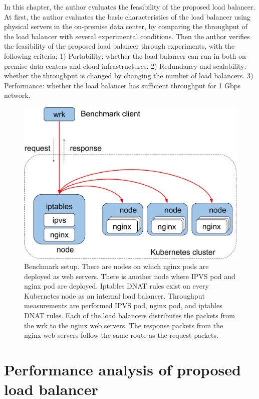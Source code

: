 In this chapter, the author evaluates the feasibility of the proposed load balancer.
At first, the author evaluates the basic characteristics of the load balancer using physical servers in the on-premise data center, by comparing the throughput of the load balancer with several experimental conditions.
Then the author verifies the feasibility of the proposed load balancer through experiments, with the following criteria;
1) Portability: whether the load balancer can run in both on-premise data centers and cloud infrastructures.
2) Redundancy and scalability: whether the throughput is changed by changing the number of load balancers.
3) Performance: whether the load balancer has sufficient throughput for 1 Gbps network.

\begin{figure}[h]
  \centering
  \includegraphics[width=0.8\columnwidth]{Figs/benchmark-schem}
  \par\bigskip
  \centering
  \begin{minipage}{0.9\columnwidth}
    \caption[Benchmark setup]{
      Benchmark setup.
      There are nodes on which nginx pods are deployed as web servers.
      There is another node where IPVS pod and nginx pod are deployed.
      Iptables DNAT rules exist on every Kubernetes node as an internal load balancer.
      Throughput measurements are performed  IPVS pod, nginx pod, and iptables DNAT rules.
      Each of the load balancers distributes the packets from the wrk to the nginx web servers.
      The response packets from the nginx web servers follow the same route as the request packets.  
    }
    \label{fig:benchmark-schem}
  \end{minipage}
\end{figure}

\section{Performance analysis of proposed load balancer}

